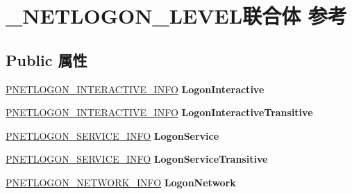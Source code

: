 \hypertarget{union___n_e_t_l_o_g_o_n___l_e_v_e_l}{}\section{\+\_\+\+N\+E\+T\+L\+O\+G\+O\+N\+\_\+\+L\+E\+V\+E\+L联合体 参考}
\label{union___n_e_t_l_o_g_o_n___l_e_v_e_l}
\subsection*{Public 属性}
\begin{DoxyCompactItemize}
\item 
\mbox{\label{union___n_e_t_l_o_g_o_n___l_e_v_e_l_a2b3975e7efba5fb980e06f97ef81692c}} 
\hyperlink{struct___n_e_t_l_o_g_o_n___i_n_t_e_r_a_c_t_i_v_e___i_n_f_o}{P\+N\+E\+T\+L\+O\+G\+O\+N\+\_\+\+I\+N\+T\+E\+R\+A\+C\+T\+I\+V\+E\+\_\+\+I\+N\+FO} {\bfseries Logon\+Interactive}
\item 
\mbox{\label{union___n_e_t_l_o_g_o_n___l_e_v_e_l_aa402ec4ae1c94e0e91d6e0fc6ccbd64e}} 
\hyperlink{struct___n_e_t_l_o_g_o_n___i_n_t_e_r_a_c_t_i_v_e___i_n_f_o}{P\+N\+E\+T\+L\+O\+G\+O\+N\+\_\+\+I\+N\+T\+E\+R\+A\+C\+T\+I\+V\+E\+\_\+\+I\+N\+FO} {\bfseries Logon\+Interactive\+Transitive}
\item 
\mbox{\label{union___n_e_t_l_o_g_o_n___l_e_v_e_l_ab2f330079751409bc3975617780a1f85}} 
\hyperlink{struct___n_e_t_l_o_g_o_n___s_e_r_v_i_c_e___i_n_f_o}{P\+N\+E\+T\+L\+O\+G\+O\+N\+\_\+\+S\+E\+R\+V\+I\+C\+E\+\_\+\+I\+N\+FO} {\bfseries Logon\+Service}
\item 
\mbox{\label{union___n_e_t_l_o_g_o_n___l_e_v_e_l_a5408cdb4261f5376263cec37717981fb}} 
\hyperlink{struct___n_e_t_l_o_g_o_n___s_e_r_v_i_c_e___i_n_f_o}{P\+N\+E\+T\+L\+O\+G\+O\+N\+\_\+\+S\+E\+R\+V\+I\+C\+E\+\_\+\+I\+N\+FO} {\bfseries Logon\+Service\+Transitive}
\item 
\mbox{\label{union___n_e_t_l_o_g_o_n___l_e_v_e_l_ac99ccb742badb987869b2ceff0bf0ff4}} 
\hyperlink{struct___n_e_t_l_o_g_o_n___n_e_t_w_o_r_k___i_n_f_o}{P\+N\+E\+T\+L\+O\+G\+O\+N\+\_\+\+N\+E\+T\+W\+O\+R\+K\+\_\+\+I\+N\+FO} {\bfseries Logon\+Network}

\end{DoxyCompactItemize}
